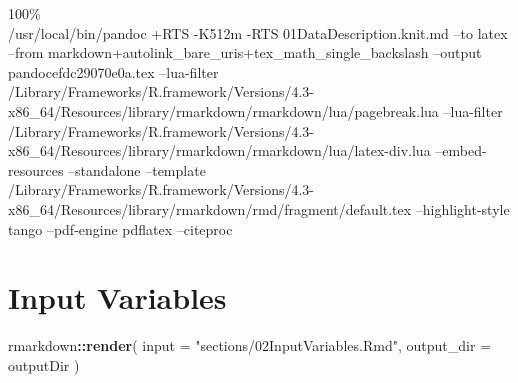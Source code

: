 \documentclass[
]{article}
\newenvironment{Shaded}{\begin{snugshade}}{\end{snugshade}}
\newcommand{\AttributeTok}[1]{\textcolor[rgb]{0.13,0.29,0.53}{#1}}
\newcommand{\FunctionTok}[1]{\textcolor[rgb]{0.13,0.29,0.53}{\textbf{#1}}}
\newcommand{\NormalTok}[1]{#1}
\newcommand{\SpecialCharTok}[1]{\textcolor[rgb]{0.81,0.36,0.00}{\textbf{#1}}}
\newcommand{\StringTok}[1]{\textcolor[rgb]{0.31,0.60,0.02}{#1}}
\begin{document}
100\%\\
/usr/local/bin/pandoc +RTS -K512m -RTS 01DataDescription.knit.md --to
latex --from markdown+autolink\_bare\_uris+tex\_math\_single\_backslash
--output pandocefdc29070e0a.tex --lua-filter
/Library/Frameworks/R.framework/Versions/4.3-x86\_64/Resources/library/rmarkdown/rmarkdown/lua/pagebreak.lua
--lua-filter
/Library/Frameworks/R.framework/Versions/4.3-x86\_64/Resources/library/rmarkdown/rmarkdown/lua/latex-div.lua
--embed-resources --standalone --template
/Library/Frameworks/R.framework/Versions/4.3-x86\_64/Resources/library/rmarkdown/rmd/fragment/default.tex
--highlight-style tango --pdf-engine pdflatex --citeproc

\hypertarget{input-variables}{%
\section{Input Variables}\label{input-variables}}

\begin{Shaded}
\begin{Highlighting}[]
\NormalTok{rmarkdown}\SpecialCharTok{::}\FunctionTok{render}\NormalTok{(}
  \AttributeTok{input =} \StringTok{"sections/02InputVariables.Rmd"}\NormalTok{,}
  \AttributeTok{output\_dir =}\NormalTok{ outputDir}
\NormalTok{)}
\end{Highlighting}
\end{Shaded}
\end{document}
